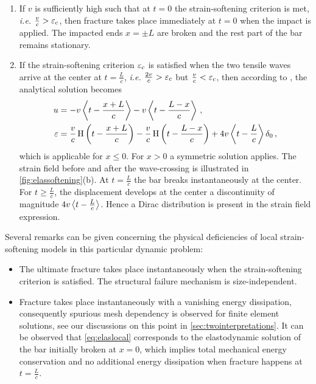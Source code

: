 \begin{enumerate}
\item If $v$ is sufficiently high such that at $t=0$ the strain-softening criterion is met, \emph{i.e.} $\frac{v}{c}>\varepsilon_{\mathrm{c}}$, then fracture takes place immediately at $t=0$ when the impact is applied. The impacted ends $x=\pm L$ are broken and the rest part of the bar remains stationary.

\item If the strain-softening criterion $\varepsilon_{\mathrm{c}}$ is satisfied when the two tensile waves arrive at the center at $t=\frac{L}{c}$, \emph{i.e.} $\frac{2v}{c}>\varepsilon_{\mathrm{c}}$ but $\frac{v}{c}<\varepsilon_{\mathrm{c}}$, then according to \cite{Bazant:1985aa}, the analytical solution becomes
\begin{equation} \label{eq:elaslocal}
\begin{aligned}
u &= -v\Braket{t-\frac{x+L}{c}}-v\Braket{t-\frac{L-x}{c}}\,, \\
\varepsilon &= \frac{v}{c}\operatorname{H}\left(t-\frac{x+L}{c}\right)-\frac{v}{c}\operatorname{H}\left(t-\frac{L-x}{c}\right)+4v\Braket{t-\frac{L}{c}}\delta_0\,,
\end{aligned}
\end{equation}
which is applicable for $x\leq 0$. For $x>0$ a symmetric solution applies. The strain field before and after the wave-crossing is illustrated in \cref{fig:elassoftening}(b). At $t=\frac{L}{c}$ the bar breaks instantaneously at the center. For $t\geq\frac{L}{c}$, the displacement develops at the center a discontinuity of magnitude $4v\Braket{t-\frac{L}{c}}$. Hence a Dirac distribution is present in the strain field expression.
\end{enumerate}

Several remarks can be given concerning the physical deficiencies of local strain-softening models in this particular dynamic problem:
\begin{itemize}
\item The ultimate fracture takes place instantaneously when the strain-softening criterion is satisfied. The structural failure mechanism is size-independent.

\item Fracture takes place instantaneously with a vanishing energy dissipation, consequently spurious mesh dependency is observed for finite element solutions, see our discussions on this point in \cref{sec:twointerpretations}. It can be observed that \eqref{eq:elaslocal} corresponds to the elastodynamic solution of the bar initially broken at $x=0$, which implies total mechanical energy conservation and no additional energy dissipation when fracture happens at $t=\frac{L}{c}$.
\end{itemize}

